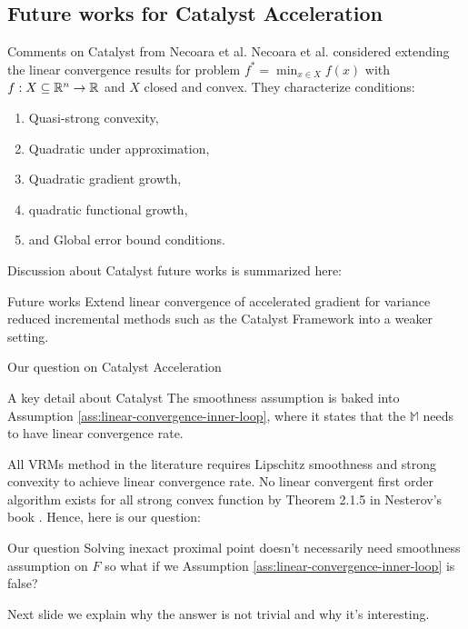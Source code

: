 \documentclass[11pt]{beamer}
\theoremstyle{definition}
\begin{document}
    \subsection{Future works for Catalyst Acceleration}
        \begin{frame}{Comments on Catalyst from Necoara et al. }
            Necoara et al. \cite{necoara_linear_2019} considered extending the linear convergence results for problem $f^* = \min_{x \in X} f(x)$ with $f: X \subseteq \mathbb R^n \rightarrow \mathbb R$ and $X$ closed and convex.
            They characterize conditions: 
            \begin{enumerate}
                \item Quasi-strong convexity, 
                \item Quadratic under approximation, 
                \item Quadratic gradient growth,
                \item quadratic functional growth, 
                \item and Global error bound conditions. 
            \end{enumerate}
            Discussion about Catalyst future works is summarized here: 
            \begin{alertblock}{Future works}
                Extend linear convergence of accelerated gradient for variance reduced incremental methods such as the Catalyst Framework into a weaker setting. 
            \end{alertblock}
            
        \end{frame}
        \begin{frame}{Our question on Catalyst Acceleration}
            \begin{block}{A key detail about Catalyst}
                The smoothness assumption is baked into Assumption \ref{ass:linear-convergence-inner-loop}, where it states that the $\mathbb M$ needs to have linear convergence rate. 
            \end{block}
            All VRMs method in the literature requires Lipschitz smoothness and strong convexity to achieve linear convergence rate. 
            No linear convergent first order algorithm exists for all strong convex function by Theorem 2.1.5 in Nesterov's book \cite{nesterov_lectures_2018}. 
            Hence, here is our question: 
            \begin{alertblock}{Our question}
                Solving inexact proximal point doesn't necessarily need smoothness assumption on $F$ so what if we Assumption \ref{ass:linear-convergence-inner-loop} is false? 
            \end{alertblock}
            Next slide we explain why the answer is not trivial and why it's interesting. 
        \end{frame}
\end{document}
